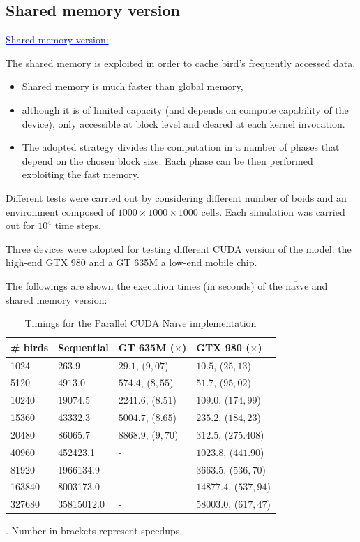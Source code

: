 \documentclass{beamer}
\begin{document}
\subsection{Shared memory version}
\begin{frame}
\textcolor{blue}{\underline{Shared memory version:}}

The shared memory is exploited in order to cache
bird's frequently accessed data.
\begin{itemize}
\item Shared memory is much faster than global memory,
\item although it is of limited capacity (and
depends on compute capability of the device), only accessible at block level and cleared at
each kernel invocation.
\item The adopted strategy divides the computation in a number
of phases that depend on the chosen block size. Each phase
can be then performed exploiting the fast memory.
\end{itemize} 
Different tests were carried out  by considering
different number of boids and an environment composed of
$1000 \times 1000 \times 1000$ cells. Each simulation was carried out for
$10^4$ time steps.
\end{frame}
\begin{frame}
Three devices were adopted for testing different CUDA
version of the model: the high-end GTX 980 and a GT 635M a low-end mobile chip.

The followings are shown the execution times (in seconds) of the na$\ddot{i}$ve and shared memory version:

\begin{table} [h!]
	\centering
		\begin{tabular}{|l |l |l| l|}
	\hline
	\# birds & Sequential & GT	635M ($\times$) & GTX 980 ($\times$) 
	\\
	\hline
	
	1024  	& \(263.9\) 	& $29.1$, ($9,07$) 	& $10.5$, ($25,13$) \\
	5120  	& \(4913.0\) 	& $574.4$, ($8,55$) 	& $51.7$, ($95,02$)  \\
	10240 	&  $19074.5$ 	& $2241.6$, ($8.51$) 	& $109.0$, ($174,99$)  \\
	15360 	& \(43332.3\) 	& $5004.7$, ($8.65$) 	& $235.2$, ($184,23$)  \\
	20480  	& 86065.7 		& $8868.9$, ($9,70$) 	& $312.5$, ($275.408$) \\
	40960  	& 452423.1 		& - 						& $1023.8$, ($441.90$)  \\
	81920  	& 1966134.9 	& - 						& $3663.5$, ($536,70$)  \\
	163840  & 8003173.0 	& - 						& $14877.4$, ($537,94$)	 \\
	327680  & 35815012.0 	& - 						& $58003.0$, ($617,47$)  \\
	\hline
	\end{tabular}
	\caption{Timings for the Parallel CUDA Na\"ive implementation}. Number in brackets represent speedups.
	\label{tab:naive}
\end{table}
\end{frame}
\end{document}
